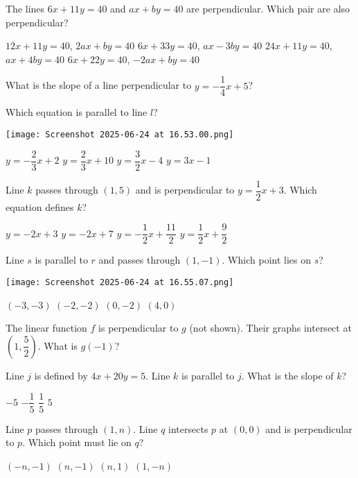 \documentclass[12pt]{exam}
\begin{document}
\begin{questions}
\question The lines $6x + 11y = 40$ and $ax + by = 40$ are perpendicular. Which pair are also perpendicular?
\begin{choices}
\choice $12x + 11y = 40$, $2ax + by = 40$
\choice $6x + 33y = 40$, $ax - 3by = 40$
\choice $24x + 11y = 40$, $ax + 4by = 40$
\choice $6x + 22y = 40$, $-2ax + by = 40$
\end{choices}

\question What is the slope of a line perpendicular to $y = -\dfrac{1}{4}x + 5$?

\question Which equation is parallel to line $l$?
\begin{center}
\texttt{[image: Screenshot 2025-06-24 at 16.53.00.png]}
\end{center}
\begin{choices}
\choice $y = -\dfrac{2}{3}x + 2$
\choice $y = \dfrac{2}{3}x + 10$
\choice $y = \dfrac{3}{2}x - 4$
\choice $y = 3x - 1$
\end{choices}

\question Line $k$ passes through $(1,5)$ and is perpendicular to $y = \dfrac{1}{2}x + 3$. Which equation defines $k$?
\begin{choices}
\choice $y = -2x + 3$
\choice $y = -2x + 7$
\choice $y = -\dfrac{1}{2}x + \dfrac{11}{2}$
\choice $y = \dfrac{1}{2}x + \dfrac{9}{2}$
\end{choices}

\question Line $s$ is parallel to $r$ and passes through $(1,-1)$. Which point lies on $s$?
\begin{center}
\texttt{[image: Screenshot 2025-06-24 at 16.55.07.png]}
\end{center}
\begin{choices}
\choice $(-3,-3)$
\choice $(-2,-2)$
\choice $(0,-2)$
\choice $(4,0)$
\end{choices}

\question The linear function $f$ is perpendicular to $g$ (not shown). Their graphs intersect at $\left(1,\dfrac{5}{2}\right)$. What is $g(-1)$?

\question Line $j$ is defined by $4x + 20y = 5$. Line $k$ is parallel to $j$. What is the slope of $k$?
\begin{choices}
\choice $-5$
\choice $-\dfrac{1}{5}$
\choice $\dfrac{1}{5}$
\choice $5$
\end{choices}

\question Line $p$ passes through $(1,n)$. Line $q$ intersects $p$ at $(0,0)$ and is perpendicular to $p$. Which point must lie on $q$?
\begin{choices}
\choice $(-n,-1)$
\choice $(n,-1)$
\choice $(n,1)$
\choice $(1,-n)$
\end{choices}


\end{questions}
\end{document}
